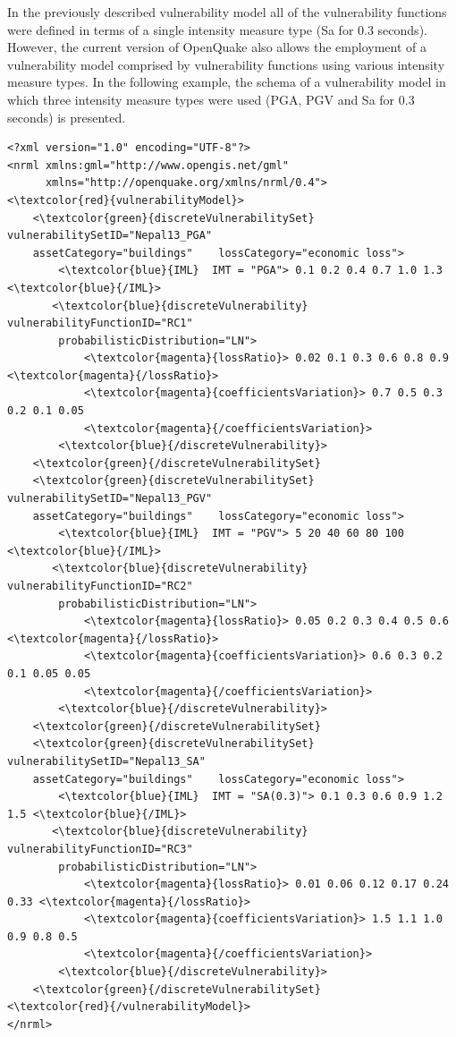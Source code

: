 In the previously described vulnerability model all of the vulnerability functions were defined in terms of a single intensity measure type (Sa for 0.3 seconds). However, the current version of OpenQuake also allows the employment of a vulnerability model comprised by vulnerability functions using various intensity measure types. In the following example, the schema of a vulnerability model in which three intensity measure types were used (PGA, PGV and Sa for 0.3 seconds) is presented.

\begin{Verbatim}[frame=single, commandchars=\\\{\}, samepage=false]
<?xml version="1.0" encoding="UTF-8"?>
<nrml xmlns:gml="http://www.opengis.net/gml"
      xmlns="http://openquake.org/xmlns/nrml/0.4">
<\textcolor{red}{vulnerabilityModel}>
    <\textcolor{green}{discreteVulnerabilitySet} vulnerabilitySetID="Nepal13_PGA"
    assetCategory="buildings"    lossCategory="economic loss">
        <\textcolor{blue}{IML}  IMT = "PGA"> 0.1 0.2 0.4 0.7 1.0 1.3 <\textcolor{blue}{/IML}>
       <\textcolor{blue}{discreteVulnerability}  vulnerabilityFunctionID="RC1" 
        probabilisticDistribution="LN">
            <\textcolor{magenta}{lossRatio}> 0.02 0.1 0.3 0.6 0.8 0.9 <\textcolor{magenta}{/lossRatio}>
            <\textcolor{magenta}{coefficientsVariation}> 0.7 0.5 0.3 0.2 0.1 0.05 
            <\textcolor{magenta}{/coefficientsVariation}>
        <\textcolor{blue}{/discreteVulnerability}>
    <\textcolor{green}{/discreteVulnerabilitySet} 
    <\textcolor{green}{discreteVulnerabilitySet} vulnerabilitySetID="Nepal13_PGV"
    assetCategory="buildings"    lossCategory="economic loss">
        <\textcolor{blue}{IML}  IMT = "PGV"> 5 20 40 60 80 100 <\textcolor{blue}{/IML}>
       <\textcolor{blue}{discreteVulnerability}  vulnerabilityFunctionID="RC2" 
        probabilisticDistribution="LN">
            <\textcolor{magenta}{lossRatio}> 0.05 0.2 0.3 0.4 0.5 0.6 <\textcolor{magenta}{/lossRatio}>
            <\textcolor{magenta}{coefficientsVariation}> 0.6 0.3 0.2 0.1 0.05 0.05 
            <\textcolor{magenta}{/coefficientsVariation}>
        <\textcolor{blue}{/discreteVulnerability}>
    <\textcolor{green}{/discreteVulnerabilitySet} 
    <\textcolor{green}{discreteVulnerabilitySet} vulnerabilitySetID="Nepal13_SA"
    assetCategory="buildings"    lossCategory="economic loss">
        <\textcolor{blue}{IML}  IMT = "SA(0.3)"> 0.1 0.3 0.6 0.9 1.2 1.5 <\textcolor{blue}{/IML}>
       <\textcolor{blue}{discreteVulnerability}  vulnerabilityFunctionID="RC3" 
        probabilisticDistribution="LN">
            <\textcolor{magenta}{lossRatio}> 0.01 0.06 0.12 0.17 0.24 0.33 <\textcolor{magenta}{/lossRatio}>
            <\textcolor{magenta}{coefficientsVariation}> 1.5 1.1 1.0 0.9 0.8 0.5 
            <\textcolor{magenta}{/coefficientsVariation}>
        <\textcolor{blue}{/discreteVulnerability}>
    <\textcolor{green}{/discreteVulnerabilitySet} 
<\textcolor{red}{/vulnerabilityModel}>  
</nrml>      
\end{Verbatim}

